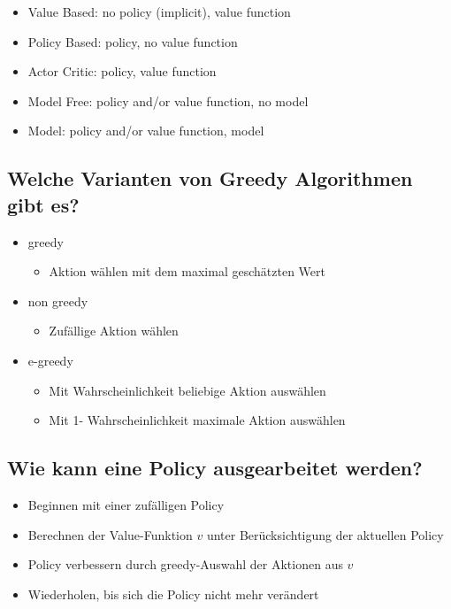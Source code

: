 \documentclass[a4paper]{article}
\begin{document}
		\begin{itemize}
			\item Value Based: no policy (implicit), value function
			\item Policy Based: policy, no value function
			\item Actor Critic: policy, value function
			\item Model Free: policy and/or value function, no model
			\item Model: policy and/or value function, model
		\end{itemize}
	
		\subsection{Welche Varianten von Greedy Algorithmen gibt es?}
		
		\begin{itemize}
			\item greedy
				\begin{itemize}
					\item Aktion wählen mit dem maximal geschätzten Wert
				\end{itemize}
			\item non greedy
				\begin{itemize}
					\item Zufällige Aktion wählen
				\end{itemize}
			\item e-greedy
				\begin{itemize}
					\item Mit Wahrscheinlichkeit beliebige Aktion auswählen
					\item Mit 1- Wahrscheinlichkeit maximale Aktion auswählen
				\end{itemize}
		\end{itemize}
	
		\subsection{Wie kann eine Policy ausgearbeitet werden?}
		
		\begin{itemize}
			\item Beginnen mit einer zufälligen Policy
			\item Berechnen der Value-Funktion $v$ unter Berücksichtigung der aktuellen Policy
			\item Policy verbessern durch greedy-Auswahl der Aktionen aus $v$
			\item Wiederholen, bis sich die Policy nicht mehr verändert
		\end{itemize}
	
\end{document}
